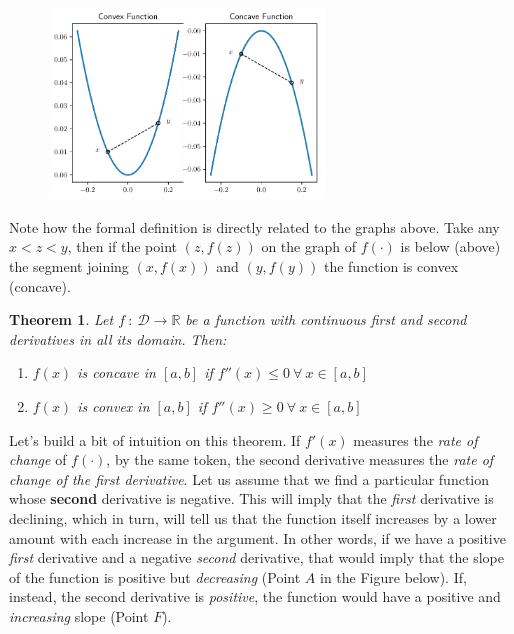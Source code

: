 \documentclass[a4paper,11pt]{article}
\theoremstyle{definition}
\theoremstyle{plain}
\newtheorem{theorem}{Theorem}
\begin{document}
    \begin{figure}[htbp]
    	\centering 
    		\includegraphics[width = 0.65\textwidth]{Ch2_files/Ch2_25_0.pdf}
    \end{figure}
    
    Note how the formal definition is directly related to the graphs above.
Take any \(x < z < y\), then if the point \(\left(z, f(z)\right)\) on
the graph of \(f(\cdot)\) is below (above) the segment joining
\(\left(x, f(x)\right)\) and \(\left(y, f(y)\right)\) the function is
convex (concave).

\begin{theorem}
Let \(f \: : \: \mathcal{D}\rightarrow\mathbb{R}\) be
a function with continuous first and second derivatives in all its
domain. Then: 
\begin{enumerate}
    \item \(f(x)\) is concave in \([a,b]\) if \(f''(x) \leq 0 \: \forall \: x\in[a,b]\) 
    \item \(f(x)\) is convex in \([a,b]\) if \(f''(x) \geq 0 \: \forall \: x\in[a,b]\)
\end{enumerate}
\end{theorem}

Let's build a bit of intuition on this theorem. If \(f'(x)\) measures
the \emph{rate of change} of \(f(\cdot)\), by the same token, the second
derivative measures the \emph{rate of change of the first derivative}.
Let us assume that we find a particular function whose \textbf{second}
derivative is negative. This will imply that the \emph{first} derivative
is declining, which in turn, will tell us that the function itself
increases by a lower amount with each increase in the argument. In other
words, if we have a positive \emph{first} derivative and a negative
\emph{second} derivative, that would imply that the slope of the
function is positive but \emph{decreasing} (Point \(A\) in the Figure
below). If, instead, the second derivative is \emph{positive}, the
function would have a positive and \emph{increasing} slope (Point
\(F\)).
\end{document}
